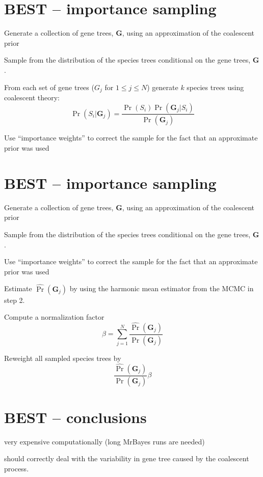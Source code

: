 \documentclass[landscape]{foils}
\begin{document}
\section*{BEST -- importance sampling}
\begin{compactenum}
	\item Generate a collection of gene trees, $\bm{G}$, using an approximation of the coalescent prior
	\item Sample from the distribution of the species trees conditional on the gene trees, $\bm{G}$.
		\begin{compactenum}
		\item From each set of gene trees (${G}_j$ for $1\leq j\leq N$) generate $k$ species trees using coalescent theory:
			 \[\Pr(S_i|\bm{G}_j) = \frac{\Pr(S_i)\Pr(\bm{G}_j|S_i)}{\Pr(\bm{G}_j)}\]
		\end{compactenum}
	\item Use ``importance weights'' to correct the sample for the fact that an approximate prior was used
\end{compactenum}

\myNewSlide
\section*{BEST -- importance sampling}
\begin{compactenum}
	\item Generate a collection of gene trees, $\bm{G}$, using an approximation of the coalescent prior
	\item Sample from the distribution of the species trees conditional on the gene trees, $\bm{G}$.
	\item Use ``importance weights'' to correct the sample for the fact that an approximate prior was used
		\begin{compactenum}
		\item Estimate $\widehat{\Pr}(\bm{G}_j)$ by using the harmonic mean estimator from the MCMC in step 2.
		\item Compute a normalization factor \[\beta = \sum_{j=1}^N \frac{\widehat{\Pr}(\bm{G}_j)}{\Pr(\bm{G}_j)} \]
		  \item Reweight all sampled species trees by \[ \frac{\widehat{\Pr}(\bm{G}_j)}{\Pr(\bm{G}_j)}\beta\]
		\end{compactenum}
\end{compactenum}

\myNewSlide
\section*{BEST -- conclusions}
\begin{compactenum}
	\item very expensive computationally (long MrBayes runs are needed)
	\item should correctly deal with the variability in gene tree caused by the coalescent process.
\end{compactenum}
\end{document}
